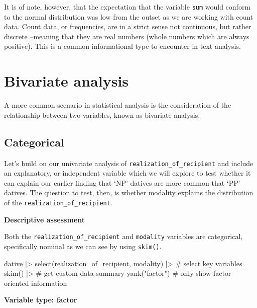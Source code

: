 \documentclass[
  letterpaper,
]{latex/krantz}
\newenvironment{Shaded}{\begin{snugshade}}{\end{snugshade}}
\newcommand{\CommentTok}[1]{\textcolor[rgb]{0.37,0.37,0.37}{#1}}
\newcommand{\FunctionTok}[1]{\textcolor[rgb]{0.28,0.35,0.67}{#1}}
\newcommand{\NormalTok}[1]{\textcolor[rgb]{0.00,0.23,0.31}{#1}}
\newcommand{\SpecialCharTok}[1]{\textcolor[rgb]{0.37,0.37,0.37}{#1}}
\newcommand{\StringTok}[1]{\textcolor[rgb]{0.13,0.47,0.30}{#1}}
\begin{document}
It is of note, however, that the expectation that the variable
\texttt{sum} would conform to the normal distribution was low from the
outset as we are working with count data. Count data, or frequencies,
are in a strict sense not continuous, but rather discrete --meaning that
they are real numbers (whole numbers which are always positive). This is
a common informational type to encounter in text analysis.

\hypertarget{bivariate-analysis}{%
\section{Bivariate analysis}\label{bivariate-analysis}}

A more common scenario in statistical analysis is the consideration of
the relationship between two-variables, known as bivariate analysis.

\hypertarget{categorical-1}{%
\subsection{Categorical}\label{categorical-1}}

Let's build on our univariate analysis of
\texttt{realization\_of\_recipient} and include an explanatory, or
independent variable which we will explore to test whether it can
explain our earlier finding that `NP' datives are more common that `PP'
datives. The question to test, then, is whether modality explains the
distribution of the \texttt{realization\_of\_recipient}.

\textbf{Descriptive assessment}

Both the \texttt{realization\_of\_recipient} and \texttt{modality}
variables are categorical, specifically nominal as we can see by using
\texttt{skim()}.

\begin{Shaded}
\begin{Highlighting}[]
\NormalTok{dative }\SpecialCharTok{|\textgreater{}} 
  \FunctionTok{select}\NormalTok{(realization\_of\_recipient, modality) }\SpecialCharTok{|\textgreater{}} \CommentTok{\# select key variables}
  \FunctionTok{skim}\NormalTok{() }\SpecialCharTok{|\textgreater{}} \CommentTok{\# get custom data summary}
  \FunctionTok{yank}\NormalTok{(}\StringTok{"factor"}\NormalTok{) }\CommentTok{\# only show factor{-}oriented information}
\end{Highlighting}
\end{Shaded}

\textbf{Variable type: factor}
\end{document}
